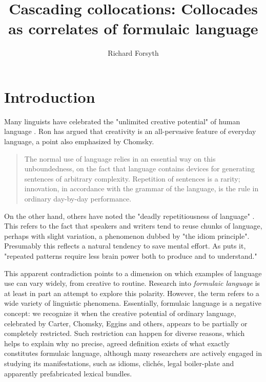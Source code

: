 \documentclass[output=paper]{langscibook}
\author{Richard Forsyth\affiliation{}}%
\title{Cascading collocations: Collocades as correlates of formulaic language}
\begin{document}
\lstset{frame=lines}
\maketitle

\section{Introduction}

Many linguists have celebrated the "unlimited creative potential" of human language \citep[117]{Eggins1994}. Ron \citet{Carter2004} has argued that creativity is an all-pervasive feature of everyday language, a point also emphasized by Chomsky.

\begin{quote}
The normal use of language relies in an essential way on this unboundedness, on the fact that language contains devices for generating sentences of arbitrary complexity. Repetition of sentences is a rarity; innovation, in accordance with the grammar of the language, is the rule in ordinary day-by-day performance.\hfill\citep[118]{Chomsky1972}\hbox{}
\end{quote}

On the other hand, others have noted the "deadly repetitiousness of language" \citep[570]{Bolinger1965}. This refers to the fact that speakers and writers tend to reuse chunks of language, perhaps with slight variation, a phenomenon dubbed by \citet{Sinclair1991} "the idiom principle". Presumably this reflects a natural tendency to save mental effort. As \citet{Halliday2014} puts it, "repeated patterns require less brain power both to produce and to understand."

This apparent contradiction points to a dimension on which examples of language use can vary widely, from creative to routine. Research into \textit{formulaic language} is at least in part an attempt to explore this polarity. However, the term refers to a wide variety of linguistic phenomena. Essentially, formulaic language is a negative concept: we recognize it when the creative potential of ordinary language, celebrated by Carter, Chomsky, Eggins and others, appears to be partially or completely restricted. Such restriction can happen for diverse reasons, which helps to explain why no precise, agreed definition exists of what exactly constitutes formulaic language, although many researchers are actively engaged in studying its manifestations, such as idioms, clichés, legal boiler-plate and apparently prefabricated lexical bundles.
\end{document}
